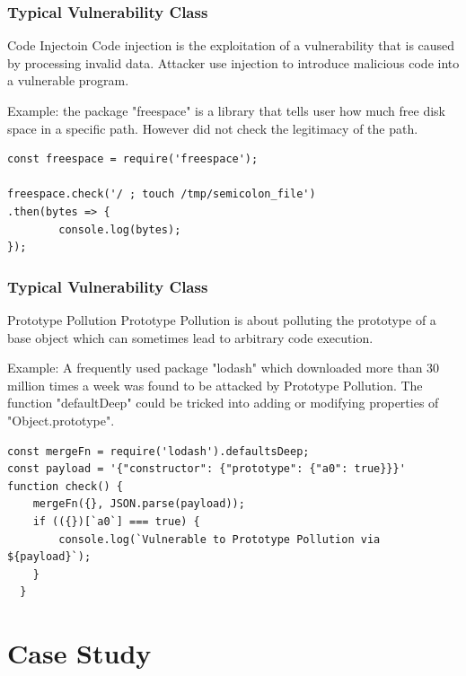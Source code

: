 \documentclass[notheorems, aspectratio=54]{beamer}
\begin{document}
\begin{frame}[fragile]
    \frametitle{Typical Vulnerability Class}
    \begin{block}{Code Injectoin}
        Code injection is the exploitation of a vulnerability that is caused by processing invalid data. Attacker use injection to introduce malicious code into a vulnerable program.

        Example:
        the package "freespace" is a library that tells user how much free disk space in a specific path. However did not check the legitimacy of the path.
    \end{block}
    \begin{lstlisting}
const freespace = require('freespace');

freespace.check('/ ; touch /tmp/semicolon_file')
.then(bytes => {
        console.log(bytes);
});
    \end{lstlisting}
\end{frame}

\begin{frame}[fragile]
    \frametitle{Typical Vulnerability Class}
    \begin{block}{Prototype Pollution}
        Prototype Pollution is about polluting the prototype of a base object which can sometimes lead to arbitrary code execution.
        
        Example: A frequently used package "lodash" which downloaded more than 30 million times a week was found to be attacked by Prototype Pollution. The function "defaultDeep" could be tricked into adding or modifying properties of "Object.prototype".
    \end{block}
    \begin{lstlisting}
const mergeFn = require('lodash').defaultsDeep;
const payload = '{"constructor": {"prototype": {"a0": true}}}'
function check() {
    mergeFn({}, JSON.parse(payload));
    if (({})[`a0`] === true) {
        console.log(`Vulnerable to Prototype Pollution via ${payload}`);
    }
  }

    \end{lstlisting}

\end{frame}


\section{Case Study}
\begin{frame}
    \tableofcontents[currentsection]
\end{frame}
\end{document}
